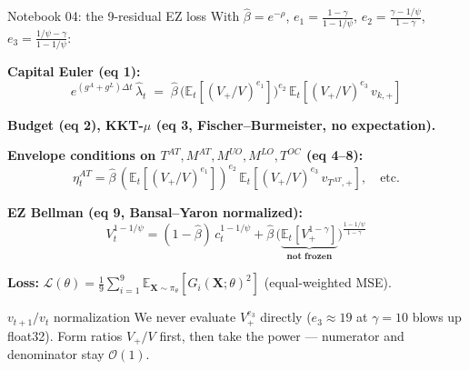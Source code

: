 \documentclass[aspectratio=169,11pt]{beamer}
\newcommand{\X}{\bm{X}}
\begin{document}
\begin{frame}{Notebook 04: the 9-residual EZ loss}
\footnotesize
With $\hat\beta = e^{-\rho}$, $e_1 = \frac{1-\gamma}{1-1/\psi}$, $e_2 = \frac{\gamma - 1/\psi}{1-\gamma}$, $e_3 = \frac{1/\psi - \gamma}{1-1/\psi}$:

\textbf{Capital Euler (eq 1):}
\[
e^{(g^{\!A}+g^{\!L})\Delta t}\,\hat\lambda_t \;=\; \hat\beta\,\big(\mathbb{E}_t[(V_+/V)^{e_1}]\big)^{e_2}\,\mathbb{E}_t\!\left[(V_+/V)^{e_3}\,v_{k,+}\right]
\]

\textbf{Budget (eq 2), KKT-$\mu$ (eq 3, Fischer–Burmeister, no expectation).}

\textbf{Envelope conditions on $T^{\!AT}, M^{\!AT}, M^{\!UO}, M^{\!LO}, T^{\!OC}$ (eq 4–8):}
\[
\eta^{\!AT}_t = \hat\beta\,(\mathbb{E}_t[(V_+/V)^{e_1}])^{e_2}\,\mathbb{E}_t[(V_+/V)^{e_3}\,v_{T^{\!AT}\!,+}], \quad \text{etc.}
\]

\textbf{EZ Bellman (eq 9, Bansal–Yaron normalized):}
\[
V_t^{1-1/\psi} = (1-\hat\beta)\,c_t^{1-1/\psi} + \hat\beta\,\big(\underbrace{\mathbb{E}_t[V_+^{1-\gamma}]}_{\textbf{not frozen}}\big)^{\!\frac{1-1/\psi}{1-\gamma}}
\]

\textbf{Loss:} $\mathcal{L}(\theta) = \frac{1}{9}\sum_{i=1}^{9}\mathbb{E}_{\X\sim\pi_\theta}[G_i(\X;\theta)^2]$ \quad (equal-weighted MSE).

\begin{alertblock}{$v_{t+1}/v_t$ normalization}
We never evaluate $V_+^{e_3}$ directly ($e_3 \approx 19$ at $\gamma=10$ blows up float32). Form ratios $V_+/V$ first, then take the power --- numerator and denominator stay $\mathcal{O}(1)$.
\end{alertblock}
\end{frame}
\end{document}
